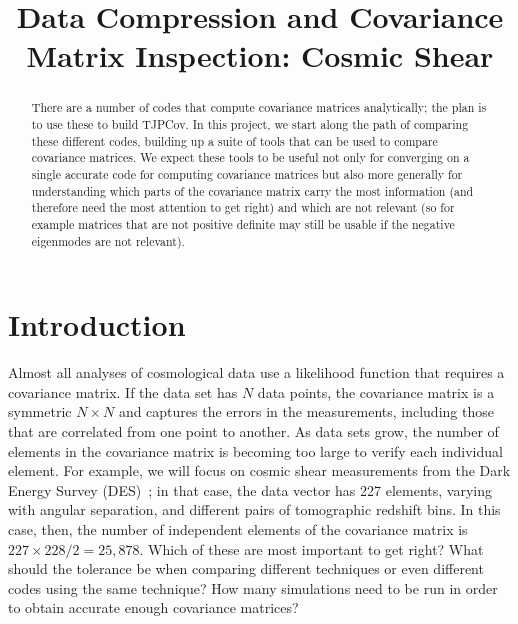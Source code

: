 \documentclass[twocolumn]{\docclass}
\begin{document}
	
	\title{Data Compression and Covariance Matrix Inspection: Cosmic Shear}
	
	\maketitlepre
	
	\begin{abstract}
		
		There  are a number of codes that compute covariance matrices analytically; the plan is to use these to build TJPCov. In this project, we start along the path of comparing these different codes, building up a suite of tools that can be used to compare covariance matrices. We expect these tools to be useful not only for converging on a single accurate code for computing covariance matrices but also more generally for understanding which parts of the covariance matrix carry the most information (and therefore need the most attention to get right) and which are not relevant (so for example matrices that are not positive definite may still be usable if the negative eigenmodes are not relevant).
	\end{abstract}
	
	\dockeys{}
	
	\maketitlepost
	
	
	\section{Introduction}
	\label{sec:intro}
	
	Almost all analyses of cosmological data use a likelihood function that requires a covariance matrix. If the data set has $N$ data points, the covariance matrix is a symmetric $N\times N$ and captures the errors in the measurements, including those that are correlated from one point to another. As data sets grow, the number of elements in the covariance matrix is becoming too large to verify each individual element. For example, we will focus on cosmic shear measurements from the Dark Energy Survey (DES)~\cite{Troxel:2017xyo}; in that case, the data vector has 227 elements, varying with angular separation, and different pairs of tomographic redshift bins. In this case, then, the number of independent elements of the covariance matrix is $227\times 228/2=25,878$. Which of these are most important to get right? What should the tolerance be when comparing different techniques or even different codes using the same technique? How many simulations need to be run in order to obtain accurate enough covariance matrices? 
	
\end{document}
